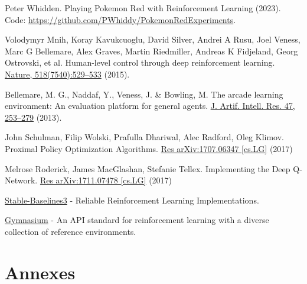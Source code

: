 \documentclass[10pt,conference]{IEEEtran}
\begin{document}
\begin{thebibliography}{1}

Peter Whidden. Playing Pokemon Red with Reinforcement Learning (2023).
Code: \url{https://github.com/PWhiddy/PokemonRedExperiments}.

Volodymyr Mnih, Koray Kavukcuoglu, David Silver, Andrei A Rusu, Joel Veness, Marc G Bellemare,
Alex Graves, Martin Riedmiller, Andreas K Fidjeland, Georg Ostrovski, et al. 
Human-level control through deep reinforcement learning. \href{www.nature.com/articles/nature14236}{Nature, 518(7540):529–533} (2015).

Bellemare, M. G., Naddaf, Y., Veness, J. \& Bowling, M.
The arcade learning environment: An evaluation platform for general agents. \href{https://jair.org/index.php/jair/article/view/10819}{J. Artif. Intell. Res. 47, 253–279} (2013). 

John Schulman, Filip Wolski, Prafulla Dhariwal, Alec Radford, Oleg Klimov.
Proximal Policy Optimization Algorithms. \href{https://arxiv.org/abs/1707.06347}{Res arXiv:1707.06347 [cs.LG]} (2017)

Melrose Roderick, James MacGlashan, Stefanie Tellex.
Implementing the Deep Q-Network. \href{https://arxiv.org/abs/1711.07478}{Res arXiv:1711.07478 [cs.LG]} (2017)

\href{https://stable-baselines3.readthedocs.io}{Stable-Baselines3} - Reliable Reinforcement Learning Implementations.

\href{https://gymnasium.farama.org}{Gymnasium} - An API standard for reinforcement learning with a diverse collection of reference environments.

\end{thebibliography}





\section{Annexes}

\end{document}
